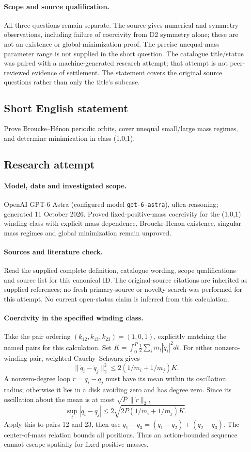 \documentclass[11pt]{article}
\begin{document}
\paragraph{Scope and source qualification.}All three questions remain separate. The source gives numerical and symmetry observations, including failure of coercivity from D2 symmetry alone; these are not an existence or global-minimization proof. The precise unequal-mass parameter range is not supplied in the short question. The catalogue title/status was paired with a machine-generated research attempt; that attempt is not peer-reviewed evidence of settlement. The statement covers the original source questions rather than only the title’s subcase.
\subsection{Short English statement}
Prove Broucke–Hénon periodic orbits, cover unequal small/large mass regimes, and determine minimization in class (1,0,1).
\subsection{Research attempt}
\paragraph{Model, date and investigated scope.}
OpenAI GPT-6 Astra (configured model \texttt{gpt-6-astra}), ultra reasoning; generated 11 October 2026. Proved fixed-positive-mass coercivity for the (1,0,1) winding class with explicit mass dependence. Broucke-Henon existence, singular mass regimes and global minimization remain unproved.

\paragraph{Sources and literature check.}
Read the supplied complete definition, catalogue wording, scope qualifications and source list for this canonical ID. The original-source citations are inherited as supplied references; no fresh primary-source or novelty search was performed for this attempt. No current open-status claim is inferred from this calculation.

\paragraph{Coercivity in the specified winding class.}Take the pair ordering \((k_{12},k_{13},k_{23})=(1,0,1)\), explicitly matching the named pairs for this calculation. Set \(K=\int_0^P\tfrac12\sum_im_i|\dot q_i|^2dt\). For either nonzero-winding pair, weighted Cauchy--Schwarz gives
\[\|\dot q_i-\dot q_j\|_2^2\le2(1/m_i+1/m_j)K.
\]
A nonzero-degree loop \(r=q_i-q_j\) must have its mean within its oscillation radius; otherwise it lies in a disk avoiding zero and has degree zero. Since its oscillation about the mean is at most \(\sqrt P\|\dot r\|_2\),
\[\sup_t|q_i-q_j|\le2\sqrt{2P(1/m_i+1/m_j)K}.
\]
Apply this to pairs 12 and 23, then use \(q_1-q_3=(q_1-q_2)+(q_2-q_3)\). The center-of-mass relation bounds all positions. Thus an action-bounded sequence cannot escape spatially for fixed positive masses.
\end{document}
